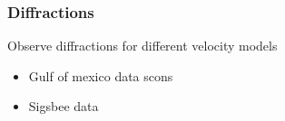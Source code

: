 \begin{frame}
	 {}
	 {}
\end{frame}	
\begin{frame}
	 {}
	 {}
\end{frame}	
\begin{frame}
	 {}
	 {}
\end{frame}	
\begin{frame}
	 {}
	 {}
\end{frame}	
\begin{frame}
	 {}
	 {}
\end{frame}	
\begin{frame} \frametitle{Diffractions}
Observe diffractions for different velocity models 
\begin{itemize}
   \item Gulf of mexico data scons 
   \item Sigsbee data 
\end{itemize}

\end{frame}
\cwpnote{}


